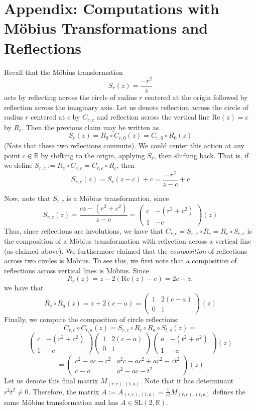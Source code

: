\documentclass[]{article}
\begin{document}
\clearpage

\section*{Appendix: Computations with M\"obius Transformations and Reflections}

Recall that the M\"obius transformation
$$
S_r(z) = \frac{-r^2}{z}
$$
acts by reflecting across the circle of radius $r$ centered at the origin followed by reflection across the imaginary axis.
Let us denote reflection across the circle of radius $r$ centered at $c$ by $C_{r, c}$ and reflection across the vertical line $\text{Re}(z) = c$ by $R_c$.
Then the previous claim may be written as
$$
S_r(z) = R_0\circ C_{r, 0}(z) = C_{r, 0}\circ R_0(z)
$$
(Note that these two reflections commute).
We could center this action at any point $c \in \mathbb{R}$ by shifting to the origin, applying $S_r$, then shifting back.
That is, if we define $S_{r, c} := R_c \circ C_{r, c} = C_{r, c}\circ R_c$, then
$$
S_{r, c}(z) = S_r(z - c) + c = \frac{-r^2}{z - c} + c
$$

Now, note that $S_{r, c}$ is a M\"obius transformation, since
$$
S_{r, c}(z) = \frac{cz - (r^2 + c^2)}{z - c} =
\begin{pmatrix}
	c & -(r^2 + c^2) \\
	1 & -c
\end{pmatrix}(z)
$$
Thus, since reflections are involutions, we have that $C_{r, c} = S_{r, c}\circ R_c = R_c\circ S_{r, c}$ is the composition of a M\"obius transformation with reflection across a vertical line (as claimed above).
We furthermore claimed that the \textit{composition} of reflections across two circles is M\"obius.
To see this, we first note that a composition of reflections across vertical lines is M\"obius.
Since
$$
R_c(z) = z - 2(\text{Re}(z) - c) = 2c - \bar{z},
$$
we have that
$$
R_c\circ R_a(z) = z + 2(c - a) =
\begin{pmatrix}
	1 & 2(c - a) \\
	0 & 1
\end{pmatrix}(z)
$$
Finally, we compute the composition of circle reflections:
$$
C_{r, c}\circ C_{t, a}(z) = S_{r, c}\circ R_c\circ R_a\circ S_{t, a}(z) = $$$$
\begin{pmatrix}
c & -(r^2 + c^2) \\
1 & -c
\end{pmatrix}
\begin{pmatrix}
1 & 2(c - a) \\
0 & 1
\end{pmatrix}
\begin{pmatrix}
a & -(t^2 + a^2) \\
1 & -a
\end{pmatrix}(z) $$$$ =
\begin{pmatrix}
c^2 - ac - r^2 & a^2c - ac^2 + ar^2 - ct^2 \\
c - a & a^2 - ac - t^2
\end{pmatrix}(z)
$$
Let us denote this final matrix $M_{(r, c), (t, a)}$.
Note that it has determinant $r^2t^2 \neq 0$.
Therefore, the matrix $A := A_{(r, c), (t, a)} = \frac{1}{rt}M_{(r, c), (t, a)}$ defines the same M\"obius transformation and has $A \in \text{SL}(2, \mathbb{R})$.
\end{document}
